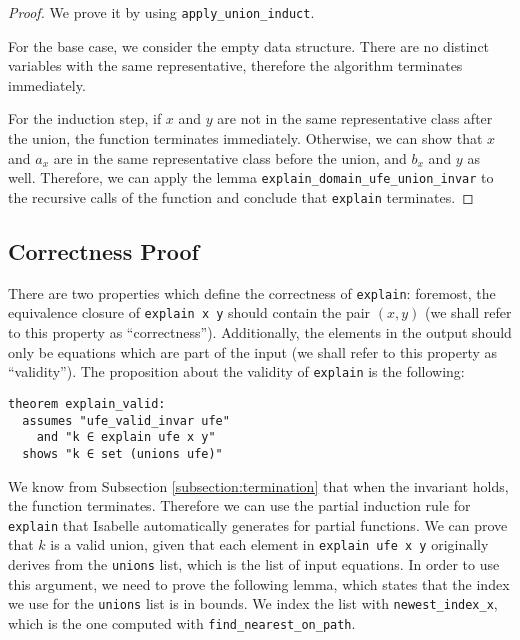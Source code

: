 \begin{proof}
We prove it by using \lstinline|apply_union_induct|.

For the base case, we consider the empty data structure. There are no distinct variables with the same representative, therefore the algorithm terminates immediately.

For the induction step, if $x$ and $y$ are not in the same representative class after the union, the function terminates immediately. Otherwise, we can show that $x$ and $a_x$ are in the same representative class before the union, and $b_x$ and $y$ as well. Therefore, we can apply the lemma \lstinline|explain_domain_ufe_union_invar| to the recursive calls of the function and conclude that \lstinline|explain| terminates.
\end{proof}

\subsection{Correctness Proof}

There are two properties which define the correctness of \lstinline|explain|: foremost, the equivalence closure of \lstinline{explain x y} should contain the pair $(x, y)$ (we shall refer to this property as ``correctness''). Additionally, the elements in the output should only be equations which are part of the input (we shall refer to this property as ``validity''). The proposition about the validity of \lstinline{explain} is the following:

\begin{lstlisting}
theorem explain_valid:
  assumes "ufe_valid_invar ufe"
    and "k ∈ explain ufe x y"
  shows "k ∈ set (unions ufe)"
\end{lstlisting}

We know from Subsection \ref{subsection:termination} that when the invariant holds, the function terminates. Therefore we can use the partial induction rule for \lstinline|explain| that Isabelle automatically generates for partial functions. We can prove that $k$ is a valid union, given that each element in \lstinline|explain ufe x y| originally derives from the \lstinline{unions} list, which is the list of input equations.
In order to use this argument, we need to prove the following lemma, which states that the index we use for the \lstinline{unions} list is in bounds.
We index the list with \lstinline|newest_index_x|, which is the one computed with \lstinline{find_nearest_on_path}.

